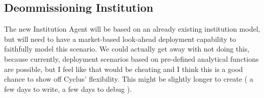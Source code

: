 
\subsection{Deommissioning Institution}

The new Institution Agent will be based on an already existing institution
model, but will need to have a market-based look-ahead deployment capability to
faithfully model this scenario. We could actually get away with not doing this,
because currently, deployment scenarios based on pre-defined analytical
functions are possible, but I feel like that would be cheating and I think this
is a good chance to show off Cyclus' flexibility. This might be slightly longer
to create ( a few days to write, a few days to debug ).

